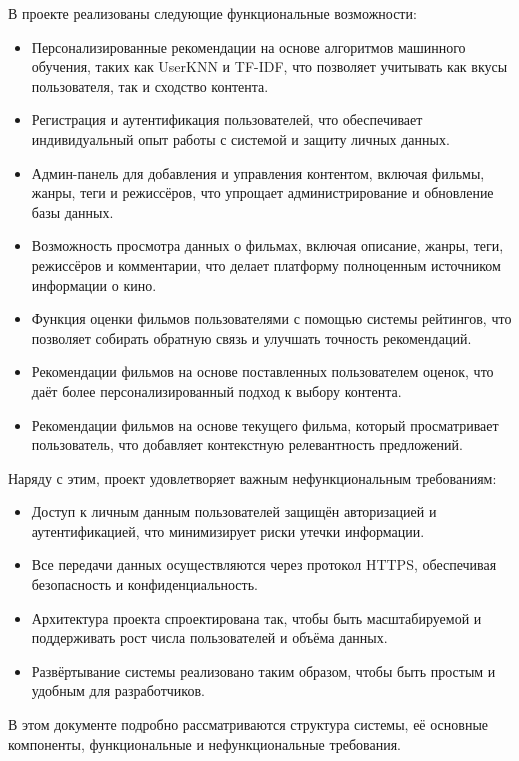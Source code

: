 В проекте реализованы следующие функциональные возможности:
\begin{itemize}
    \item Персонализированные рекомендации на основе алгоритмов машинного обучения, таких как UserKNN и TF-IDF, что позволяет учитывать как вкусы пользователя, так и сходство контента.
    \item Регистрация и аутентификация пользователей, что обеспечивает индивидуальный опыт работы с системой и защиту личных данных.
    \item Админ-панель для добавления и управления контентом, включая фильмы, жанры, теги и режиссёров, что упрощает администрирование и обновление базы данных.
    \item Возможность просмотра данных о фильмах, включая описание, жанры, теги, режиссёров и комментарии, что делает платформу полноценным источником информации о кино.
    \item Функция оценки фильмов пользователями с помощью системы рейтингов, что позволяет собирать обратную связь и улучшать точность рекомендаций.
    \item Рекомендации фильмов на основе поставленных пользователем оценок, что даёт более персонализированный подход к выбору контента.
    \item Рекомендации фильмов на основе текущего фильма, который просматривает пользователь, что добавляет контекстную релевантность предложений.
\end{itemize}

Наряду с этим, проект удовлетворяет важным нефункциональным требованиям:
\begin{itemize}
    \item Доступ к личным данным пользователей защищён авторизацией и аутентификацией, что минимизирует риски утечки информации.
    \item Все передачи данных осуществляются через протокол HTTPS, обеспечивая безопасность и конфиденциальность.
    \item Архитектура проекта спроектирована так, чтобы быть масштабируемой и поддерживать рост числа пользователей и объёма данных.
    \item Развёртывание системы реализовано таким образом, чтобы быть простым и удобным для разработчиков.
\end{itemize}

В этом документе подробно рассматриваются структура системы, её основные компоненты, функциональные и нефункциональные требования.

